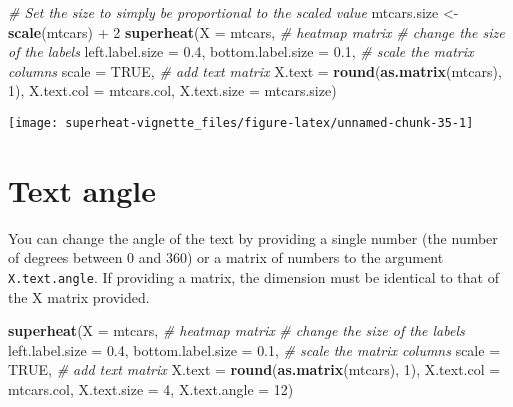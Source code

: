 \documentclass[]{book}
\newenvironment{Shaded}{\begin{snugshade}}{\end{snugshade}}
\newcommand{\KeywordTok}[1]{\textcolor[rgb]{0.13,0.29,0.53}{\textbf{{#1}}}}
\newcommand{\DataTypeTok}[1]{\textcolor[rgb]{0.13,0.29,0.53}{{#1}}}
\newcommand{\DecValTok}[1]{\textcolor[rgb]{0.00,0.00,0.81}{{#1}}}
\newcommand{\FloatTok}[1]{\textcolor[rgb]{0.00,0.00,0.81}{{#1}}}
\newcommand{\StringTok}[1]{\textcolor[rgb]{0.31,0.60,0.02}{{#1}}}
\newcommand{\CommentTok}[1]{\textcolor[rgb]{0.56,0.35,0.01}{\textit{{#1}}}}
\newcommand{\OtherTok}[1]{\textcolor[rgb]{0.56,0.35,0.01}{{#1}}}
\newcommand{\NormalTok}[1]{{#1}}
\theoremstyle{definition}
\theoremstyle{definition}
\theoremstyle{remark}
\begin{document}
\begin{Shaded}
\begin{Highlighting}[]
\CommentTok{# Set the size to simply be proportional to the scaled value}
\NormalTok{mtcars.size <-}\StringTok{ }\KeywordTok{scale}\NormalTok{(mtcars) +}\StringTok{ }\DecValTok{2}
\KeywordTok{superheat}\NormalTok{(}\DataTypeTok{X =} \NormalTok{mtcars, }\CommentTok{# heatmap matrix}
               \CommentTok{# change the size of the labels}
          \DataTypeTok{left.label.size =} \FloatTok{0.4}\NormalTok{,}
          \DataTypeTok{bottom.label.size =} \FloatTok{0.1}\NormalTok{,}
          \CommentTok{# scale the matrix columns}
          \DataTypeTok{scale =} \OtherTok{TRUE}\NormalTok{,}
          \CommentTok{# add text matrix}
          \DataTypeTok{X.text =} \KeywordTok{round}\NormalTok{(}\KeywordTok{as.matrix}\NormalTok{(mtcars), }\DecValTok{1}\NormalTok{),}
          \DataTypeTok{X.text.col =} \NormalTok{mtcars.col,}
          \DataTypeTok{X.text.size =} \NormalTok{mtcars.size)}
\end{Highlighting}
\end{Shaded}

\begin{center}\texttt{[image: superheat-vignette\_files/figure-latex/unnamed-chunk-35-1]} \end{center}

\section{Text angle}\label{text-angle}

You can change the angle of the text by providing a single number (the
number of degrees between 0 and 360) or a matrix of numbers to the
argument \texttt{X.text.angle}. If providing a matrix, the dimension
must be identical to that of the X matrix provided.

\begin{Shaded}
\begin{Highlighting}[]
\KeywordTok{superheat}\NormalTok{(}\DataTypeTok{X =} \NormalTok{mtcars, }\CommentTok{# heatmap matrix}
          \CommentTok{# change the size of the labels}
          \DataTypeTok{left.label.size =} \FloatTok{0.4}\NormalTok{,}
          \DataTypeTok{bottom.label.size =} \FloatTok{0.1}\NormalTok{,}
          \CommentTok{# scale the matrix columns}
          \DataTypeTok{scale =} \OtherTok{TRUE}\NormalTok{,}
          \CommentTok{# add text matrix}
          \DataTypeTok{X.text =} \KeywordTok{round}\NormalTok{(}\KeywordTok{as.matrix}\NormalTok{(mtcars), }\DecValTok{1}\NormalTok{),}
          \DataTypeTok{X.text.col =} \NormalTok{mtcars.col,}
          \DataTypeTok{X.text.size =} \DecValTok{4}\NormalTok{,}
          \DataTypeTok{X.text.angle =} \DecValTok{12}\NormalTok{)}
\end{Highlighting}
\end{Shaded}
\end{document}
